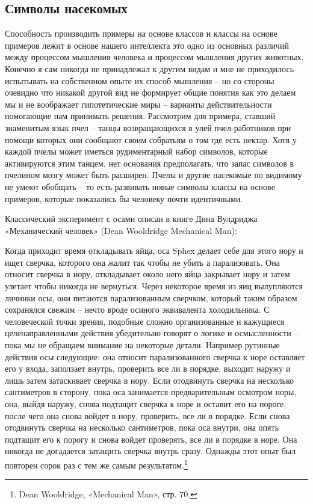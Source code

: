 \documentclass[../main.tex]{subfiles}
\begin{document}
\subsection{Символы насекомых}

Способность производить примеры на основе классов и классы на основе примеров лежит в основе нашего интеллекта это одно из основных различий между процессом мышления человека и процессом мышления других животных. Конечно я сам никогда не принадлежал к другим видам и мне не приходилось испытывать на собственном опыте их способ мышления \--- но со стороны очевидно что никакой другой вид не формирует общие понятия как это делаем мы и не воображает гипотетические миры \--- варианты действительности помогающие нам принимать решения. Рассмотрим для примера, ставший знаменитым язык пчел \--- танцы возвращающихся в улей пчел-работников при помощи которых они сообщают своим собратьям о том где есть нектар. Хотя у каждой пчелы может иметься рудиментарный набор символов, которые активируются этим танцем, нет основания предполагать, что запас символов в пчелином мозгу может быть расширен. Пчелы и другие насекомые по видимому не умеют обобщать \--- то есть развивать новые символы классы на основе примеров, которые показались бы человеку почти идентичными.

Классический эксперимент с осами описан в книге Дина Вулдриджа «Механический человек» (Dean Wooldridge Mechanical Man):

Когда приходит время откладывать яйца, оса Sphex делает себе для этого нору и ищет сверчка, которого она жалит так чтобы не убить а парализовать. Она относит сверчка в нору, откладывает около него яйца закрывает нору и затем улетает чтобы никогда не вернуться. Через некоторое время из яиц вылупляются личинки осы, они питаются парализованным сверчком, который таким образом сохранялся свежим \--- нечто вроде осиного эквивалента холодильника. С человеческой точки зрения, подобные сложно организованные и кажущиеся целенаправленными действия убедительно говорят о логике и осмысленности \--- пока мы не обращаем внимание на некоторые детали. Например рутинные действия осы следующие: она относит парализованного сверчка к норе оставляет его у входа, заползает внутрь, проверить все ли в порядке, выходит наружу и лишь затем затаскивает сверчка в нору. Если отодвинуть сверчка на несколько сантиметров в сторону, пока оса занимается предварительным осмотром норы, она, выйдя наружу, снова подтащит сверчка к норе и оставит его на пороге, после чего она снова войдет в нору, проверить, все ли в порядке. Если снова отодвинуть сверчка на несколько сантиметров, пока оса внутри, она опять подтащит его к порогу и снова войдет проверять, все ли в порядке в норе. Она никогда не догадается затащить сверчка внутрь сразу. Однажды этот опыт был повторен сорок раз с тем же самым результатом.\footnote{Dean Wooldridge, «Mechanical Man», стр. 70.}
\end{document}
